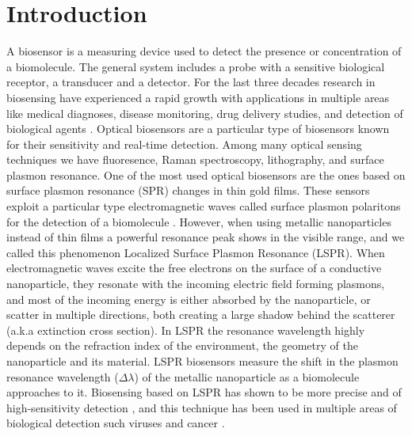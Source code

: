 \chapter{Introduction} \label{chap:intro}

A biosensor is a measuring device used to detect the presence or concentration of a biomolecule. The general system includes 
a probe with a sensitive biological receptor, a transducer and a detector. For the last three decades research in biosensing 
have experienced a rapid growth with applications in multiple areas like medical diagnoses, disease monitoring, drug delivery studies, 
and detection of biological agents \cite{Turner2000, Mohanty2006, Mehrotra2016}. Optical biosensors are a particular type of biosensors 
known for their sensitivity and real-time detection. Among many optical sensing techniques we have fluoresence, Raman spectroscopy, lithography, 
and surface plasmon resonance. One of the most used optical biosensors are the ones based on surface plasmon resonance (SPR) changes in thin gold films. These 
sensors exploit a particular type electromagnetic waves called surface plasmon polaritons for the detection of a biomolecule \cite{Homola2008}. However, when 
using metallic nanoparticles instead of thin films a powerful resonance peak shows in the visible range, and we called this phenomenon Localized Surface 
Plasmon Resonance (LSPR). When electromagnetic waves excite the free electrons on the surface of a conductive nanoparticle, they resonate with the incoming 
electric field forming plasmons, and most of the incoming energy is either absorbed by the nanoparticle, or scatter in multiple directions, both creating a 
large shadow behind the scatterer (a.k.a extinction cross section). In LSPR the resonance wavelength highly depends on the refraction index of the environment,
the geometry of the nanoparticle and its material. LSPR biosensors measure the shift in the plasmon resonance wavelength ($\Delta\lambda$) of the metallic 
nanoparticle as a biomolecule approaches to it. Biosensing based on LSPR has shown to be more precise and of high-sensitivity detection \cite{Sepulveda2009}, and
this technique has been used in multiple areas of biological detection such viruses and cancer \cite{Wang2010, Liu2014, Zhu2016}. 

